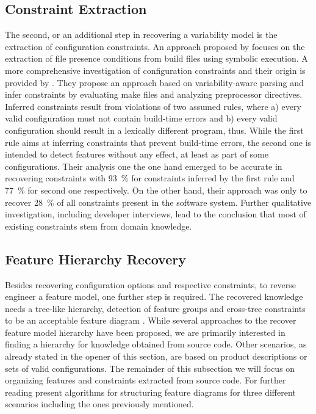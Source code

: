 \subsection{Constraint Extraction}
The second, or an additional step in recovering a variability model is the
extraction of configuration constraints. An approach proposed by \cite{zhou_extracting_2015}
focuses on the extraction of file presence conditions from build files using symbolic execution. A more comprehensive investigation of configuration
constraints and their origin is provided by \cite{nadi_mining_2014,nadi_where_2015}. They
propose an approach based on variability-aware parsing and infer constraints by
evaluating make files and  analyzing preprocessor directives. Inferred
constraints result from violations of two assumed rules, where a) every valid
configuration must not contain build-time errors and b) every valid
configuration should result in a lexically different program, thus. While the
first rule aims at inferring constraints that prevent build-time errors, the
second one is intended to detect features without any effect, at least as part
of some configurations. Their analysis one the one hand emerged to be accurate
in recovering constraints with 93~\% for constraints inferred by the first rule
and 77~\% for second one respectively. On the other hand, their approach was
only to recover 28~\% of all constraints present in the software system.
Further qualitative investigation, including developer interviews, lead to
the conclusion that most of existing constraints stem from domain knowledge.

\subsection{Feature Hierarchy Recovery} 
Besides recovering configuration options and respective constraints, to reverse
engineer a feature model, one further step is required. The recovered knowledge
needs a tree-like hierarchy, detection of feature groups and cross-tree
constraints to be an acceptable feature diagram
\citep{kang_feature-oriented_1990}. While several approaches to the recover feature model hierarchy have been proposed,
we are primarily interested in finding a hierarchy for knowledge obtained from
source code. Other scenarios, as already stated in the opener of this section,
are based on product descriptions or sets of valid configurations. The remainder of
this subsection we will focus on organizing features and constraints extracted
from source code. For further reading \cite{andersen_efficient_2012} present
algorithms for structuring feature diagrams for three different scenarios including the
ones previously mentioned.

